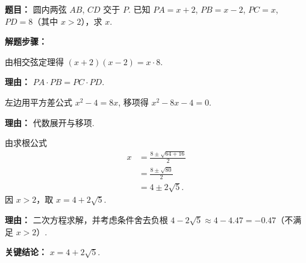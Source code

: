 \begin{examplebox}
	\textbf{\textcolor{CExample}{题目：}}
	圆内两弦 $AB$, $CD$ 交于 $P$. 已知 $PA = x+2$, $PB = x-2$, $PC = x$, $PD = 8$（其中 $x>2$），求 $x$.

	\textbf{\textcolor{CExample}{解题步骤：}}
	\begin{description}[style=nextline, leftmargin=2.8em, labelsep=0.5em, itemsep=0.45em]
		\item[\textbf{第一步（列方程）：}] 由相交弦定理得 $(x+2)(x-2) = x \cdot 8$.
			\par\textbf{理由：} $PA\cdot PB = PC\cdot PD$.
		\item[\textbf{第二步（展开化简）：}] 左边用平方差公式 $x^2 - 4 = 8x$, 移项得 $x^2 - 8x - 4 = 0$.
			\par\textbf{理由：} 代数展开与移项.
		\item[\textbf{第三步（解二次方程）：}] 由求根公式
			\[
				\begin{aligned}
					x &= \frac{8 \pm \sqrt{64 + 16}}{2} \\
					&= \frac{8 \pm \sqrt{80}}{2} \\
					&= 4 \pm 2\sqrt{5}.
			\end{aligned}
			\]
			因 $x>2$，取 $x = 4 + 2\sqrt{5}$.
			\par\textbf{理由：} 二次方程求解，并考虑条件舍去负根 $4-2\sqrt{5} \approx 4 - 4.47 = -0.47$（不满足 $x>2$）.
	\end{description}

	\textbf{\textcolor{CExample}{关键结论：}}
	\textbf{$x = 4 + 2\sqrt{5}$}.

\end{examplebox}
